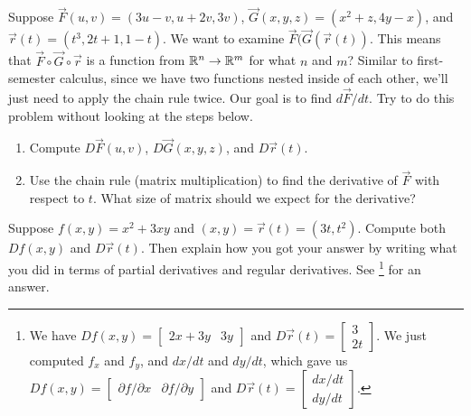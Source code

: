 \begin{problem*}[Challenge]
Suppose $\vec F(u,v) = (3u-v,u+2v,3v)$,  $\vec G(x,y,z)=(x^2+z, 4y-x)$, and $\vec r(t) = (t^3, 2t+1, 1-t)$.  We want to examine $\vec F(\vec G(\vec r(t))$.  This means that $\vec F\circ \vec G\circ \vec r$ is a function from $\mathbb{R}^n\to\mathbb{R}^m$ for what $n$ and $m$?  Similar to first-semester calculus, since we have two functions nested inside of each other, we'll just need to apply the chain rule twice.  Our goal is to find $d\vec F/dt$.  Try to do this problem without looking at the steps below.
 \begin{enumerate}
  \item Compute $D\vec F(u,v)$, $D\vec G(x,y,z)$, and $D\vec r(t)$.
  \item Use the chain rule (matrix multiplication) to find the derivative of $\vec F$ with respect to $t$.  What size of matrix should we expect for the derivative?
 \end{enumerate}
\end{problem*}


\begin{review*}
Suppose $f(x,y)=x^2+3xy$ and $(x,y) = \vec r(t) = (3t,t^2)$.  
Compute both $Df(x,y)$ and $D\vec r(t)$. Then explain how you got your answer by writing what you did in terms of partial derivatives and regular derivatives. See \footnote{We have 
$Df(x,y) = \begin{bmatrix}2x+3y&3y\end{bmatrix}$ and 
$D\vec r(t) = \begin{bmatrix}3\\2t\end{bmatrix}$. 
We just computed $f_x$ and $f_y$, and $dx/dt$ and $dy/dt$, which gave us
$Df(x,y) = \begin{bmatrix}\partial f/\partial x&\partial f/\partial y\end{bmatrix}$ and 
$D\vec r(t) = \begin{bmatrix}dx/dt\\dy/dt\end{bmatrix}$.} 
for an answer.
\end{review*}



